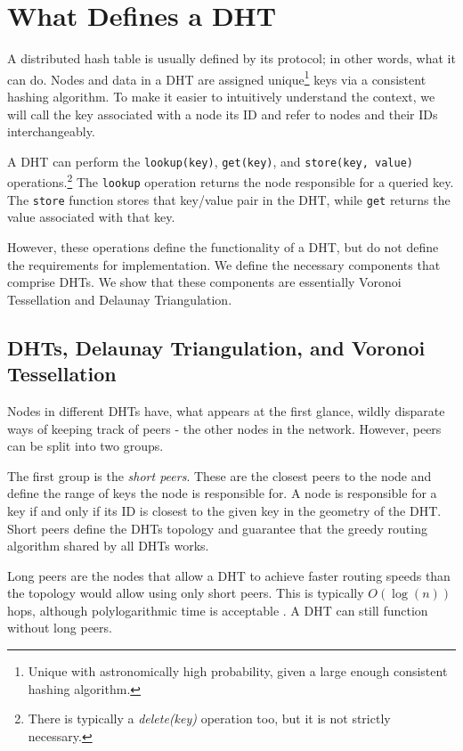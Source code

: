 \documentclass[11pt,conference]{IEEEtran}
\begin{document}
\section{What Defines a DHT}
\label{sec:define}

A distributed hash table is usually defined by its protocol; in other words, what it can do.
Nodes and data in a DHT are assigned unique\footnote{Unique with astronomically high probability, given a large enough consistent hashing algorithm.} keys via a consistent hashing algorithm.
To make it easier to intuitively understand the context, we will call the key associated with a node its ID and refer to nodes and their IDs interchangeably.

A DHT can perform the \texttt{lookup(key)}, \texttt{get(key)}, and \texttt{store(key, value)} operations.\footnote{There is typically a \textit{delete(key)} operation too, but it is not strictly necessary.}
The \texttt{lookup} operation returns the node responsible for a queried key.
The \texttt{store} function stores that key/value pair in the DHT, while \texttt{get} returns the value associated with that key.

However, these operations define the functionality of a DHT, but do not define the requirements for implementation.
We define the necessary components that comprise DHTs.
We show that these components are essentially Voronoi Tessellation and Delaunay Triangulation.

\subsection{DHTs, Delaunay Triangulation, and Voronoi Tessellation}

Nodes in different DHTs have, what appears at the first glance, wildly disparate ways of keeping track of peers - the other nodes in the network.
However, peers can be split into two groups.

The first group is the \textit{short peers}.
These are the closest peers to the node and define the range of keys the node is responsible for. 
A node is responsible for a key if and only if its ID is closest to the given key in the geometry of the DHT.
Short peers define the DHTs topology and guarantee that the greedy routing algorithm shared by all DHTs works.


Long peers are the nodes that allow a DHT to achieve faster routing speeds than the topology would allow using only short peers.
This is typically $ O(\log(n)) $ hops, although polylogarithmic time is acceptable \cite{kleinberg2000small}.
A DHT can still function without long peers.
\end{document}
